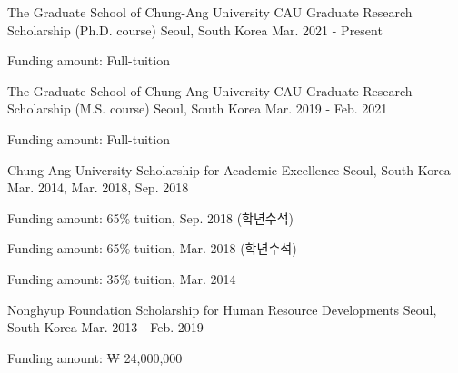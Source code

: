 \documentclass[11pt, a4paper]{awesome-cv} %
\begin{document}

\begin{cventries}
	\cventry
	{The Graduate School of Chung-Ang University} %
	{CAU Graduate Research Scholarship (Ph.D. course)} %
	{Seoul, South Korea} %
	{Mar. 2021 - Present} %
	{
		\begin{cvitems}
			\item{Funding amount: Full-tuition}
		\end{cvitems}
	}

	\cventry
	{The Graduate School of Chung-Ang University} %
	{CAU Graduate Research Scholarship (M.S. course)} %
	{Seoul, South Korea} %
	{Mar. 2019 - Feb. 2021} %
	{
		\begin{cvitems}
			\item{Funding amount: Full-tuition}
		\end{cvitems}
	}

	\cventry
	{Chung-Ang University} %
	{Scholarship for Academic Excellence} %
	{Seoul, South Korea} %
	{Mar. 2014,  Mar. 2018, Sep. 2018} %
	{
		\begin{cvitems}
			\item{Funding amount: 65\% tuition, Sep. 2018 (학년수석)}
			\item{Funding amount: 65\% tuition, Mar. 2018 (학년수석)}
			\item{Funding amount: 35\% tuition, Mar. 2014}
		\end{cvitems}
	}
	
	\cventry
	{Nonghyup Foundation} %
	{Scholarship for Human Resource Developments} %
	{Seoul, South Korea} %
	{Mar. 2013 - Feb. 2019} %
	{
		\begin{cvitems}
			\item{Funding amount: ₩ 24,000,000}
		\end{cvitems}
	}
\end{cventries}
%	
%	
%	
\end{document}
